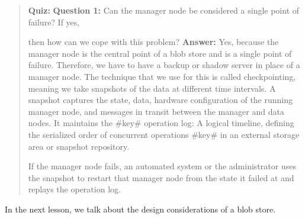 \begin{quote}
\textbf{Quiz:}
\textbf{Question 1:} Can the manager node be considered a single point of failure? If yes,

then how can we cope with this problem?
\textbf{Answer:} Yes, because the manager node is the central point of a blob store and is a single point of failure. Therefore, we have to have a backup or shadow server in place of a manager node. The technique that we use for this is called checkpointing, meaning we take snapshots of the data at different time intervals. A snapshot captures the state, data, hardware configuration of the running manager node, and messages in transit between the manager and data nodes. It maintains the \#key\# operation log: A logical timeline, defining the serialized order of concurrent operations \#key\# in an external storage area or snapshot repository.

If the manager node fails, an automated system or the administrator uses the snapshot to restart that manager node from the state it failed at and replays the operation log.
\end{quote}

In the next lesson, we talk about the design considerations of a blob store.\\

